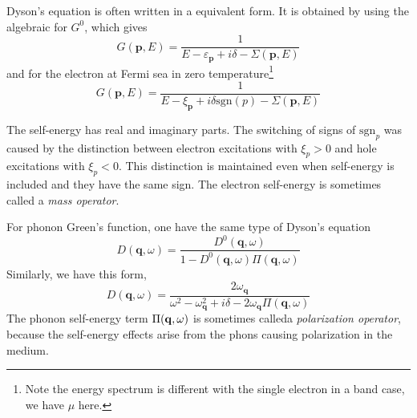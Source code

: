 Dyson's equation is often written in a equivalent form.
It is obtained by using the algebraic for $G^0$, which gives
\begin{equation}
  G(\mathbf{p},E) = \frac{1}{E-\varepsilon_\mathbf{p}+ i\delta - \Sigma(\mathbf{p},E)}  \label{2.116}
\end{equation}
and for the electron at Fermi sea in zero temperature\footnote{Note the energy spectrum is different with the single electron in a band case, we have $\mu$ here.}
\begin{equation}
  \label{2.118}
  G(\mathbf{p},E) = \frac{1}{E- \xi_\mathbf{p}+ i\delta\mathrm{sgn}(p)-\Sigma(\mathbf{p},E)}
\end{equation}

The self-energy has real and imaginary parts.
The switching of signs of $\mathrm{sgn}_p$ was caused by the distinction between electron excitations with $\xi_p>0$ and hole excitations with $\xi_p<0$.
This distinction is maintained even when self-energy is included and they have the same sign.
The electron self-energy is sometimes called a \textit{mass operator}.

For phonon Green's function, one have the same type of Dyson's equation
\begin{equation}
  \label{2.121}
  D(\mathbf{q},\omega) = \frac{D^0(\mathbf{q},\omega)}{1-D^0(\mathbf{q},\omega)\Pi(\mathbf{q},\omega)}
\end{equation}
Similarly, we have this form,
\begin{equation}
  \label{2.123}
  D(\mathbf{q},\omega) = \frac{2\omega_\mathbf{q}}{\omega^2 -\omega^2_\mathbf{q}+i\delta-2\omega_\mathbf{q} \Pi(\mathbf{q},\omega)}
\end{equation}
The phonon self-energy term $\Pi(\mathbf{q},\omega)$ is sometimes calleda \textit{polarization operator}, because the self-energy effects arise from the phons causing polarization in the medium.

